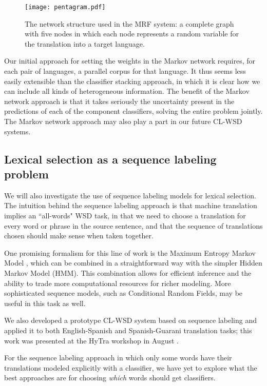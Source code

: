 \begin{figure}
  \begin{center}
  \texttt{[image: pentagram.pdf]}
  \end{center}
  \caption{The network structure used in the MRF system: a complete graph with
  five nodes in which each node represents a random variable for the
  translation into a target language.}
  \label{fig:pentagram}
\end{figure}

Our initial approach for setting the weights in the Markov network requires,
for each pair of languages, a parallel corpus for that language. It thus seems
less easily extensible than the classifier stacking approach, in which it is
clear how we can include all kinds of heterogeneous information.
The benefit of the Markov network approach is that it takes seriously the
uncertainty present in the predictions of each of the component classifiers,
solving the entire problem jointly.
The Markov network approach may also play a part in our future CL-WSD systems.

\subsection{Lexical selection as a sequence labeling problem}
We will also investigate the use of sequence labeling models for lexical
selection.  The intuition behind the sequence labeling approach is that machine
translation implies an ``all-words" WSD task, in that we need to choose a
translation for every word or phrase in the source sentence, and that the
sequence of translations chosen should make sense when taken together.

One promising formalism for this line of work is the Maximum Entropy Markov
Model \cite{icml00/mccallum}, which can be combined in a straightforward way
with the simpler Hidden Markov Model (HMM).
This combination allows for efficient inference and the ability to trade more
computational resources for richer modeling. More sophisticated sequence
models, such as Conditional Random Fields, may be useful in this task as well.

We also developed a prototype CL-WSD system based on sequence labeling and
applied it to both English-Spanish and Spanish-Guarani translation tasks; this
work was presented at the HyTra workshop in August
\cite{rudnick-gasser:2013:HyTra-2013}.

For the sequence labeling approach in which only some words have their
translations modeled explicitly with a classifier, we have yet to explore what
the best approaches are for choosing \emph{which} words should get classifiers.

